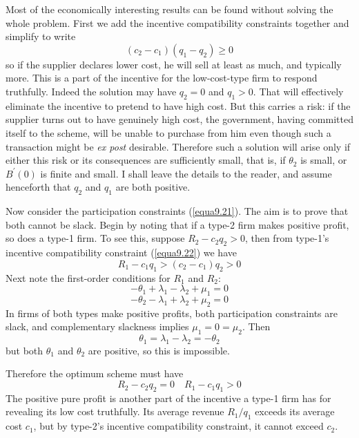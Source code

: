 Most of the economically interesting results can be found without solving the whole problem. First we add the incentive compatibility constraints together and simplify to write
\begin{equation} \label{equa9.25}
 (c_2 - c_1) (q_1 - q_2) \geq 0
\end{equation}
so if the supplier declares lower cost, he will sell at least as much, and typically more. This is a part of the incentive for the low-cost-type firm to respond truthfully. Indeed the solution may have $q_2 =0$ and $q_1 >0$. That will effectively eliminate the incentive to pretend to have high cost. But this carries a risk: if the supplier turns out to have genuinely high cost, the government, having committed itself to the scheme, will be unable to purchase from him even though such a transaction might be \textit{ex post} desirable. Therefore such a solution will arise only if either this risk or its consequences are sufficiently small, that is, if $\theta_2$ is small, or $B^\prime(0)$ is finite and small. I shall leave the details to the reader, and assume henceforth that $q_2$ and $q_1$ are both positive.

Now consider the participation constraints (\ref{equa9.21}). The aim is to prove that both cannot be slack. Begin by noting that if a type-2 firm makes positive profit, so does a type-1 firm. To see this, suppose $R_2 - c_2 q_2 > 0$, then from type-1's incentive compatibility constraint (\ref{equa9.22}) we have
\begin{equation*}
R_1 - c_1 q_1 > (c_2 - c_1) q_2 > 0
\end{equation*}
Next note the first-order conditions for $R_1$ and $R_2$:
\begin{equation*}
-\theta_1 + \lambda_1 - \lambda_2 + \mu_1 =0
\end{equation*}
\begin{equation*}
-\theta_2 - \lambda_1 + \lambda_2 + \mu_2 =0
\end{equation*}
In firms of both types make positive profits, both participation constraints are slack, and complementary slackness implies $\mu_1 = 0 = \mu_2$. Then
\begin{equation*}
\theta_1 = \lambda_1 - \lambda_2 = - \theta_2
\end{equation*}
but both $\theta_1$ and $\theta_2$ are positive, so this is impossible.

Therefore the optimum scheme must have
\begin{equation} \label{equa9.26}
R_2 - c_2 q_2 =0  \quad R_1 - c_1 q_1 > 0
\end{equation}
The positive pure profit is another part of the incentive a type-1 firm has for revealing its low cost truthfully. Its average revenue $R_1 /q_1$ exceeds its average cost $c_1$, but by type-2's incentive compatibility constraint, it cannot exceed $c_2$.


